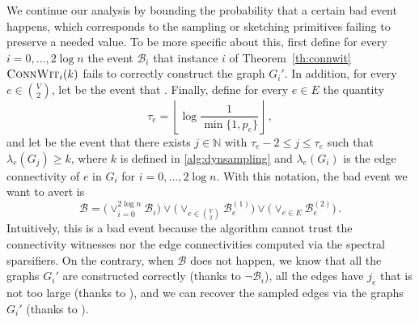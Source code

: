 \noindent
We continue our analysis by bounding the probability that a certain bad event happens, which corresponds to the sampling or sketching primitives failing to preserve a needed value. To be more specific about this, first define for every $i =0, \dots, 2\log n$ the event $\mathcal{B}_i$ that instance $i$ of Theorem~\ref{th:connwit} $\textsc{ConnWit}_i(k)$ fails to correctly construct the graph $G_i'$. In addition, for every $e \in \binom{V}{2}$, let  be the event that . Finally, define for every $e \in E$ the quantity
\begin{equation*}
	\tau_e = \left\lfloor \log \frac{1}{\min\{1, p_e\}}\right\rfloor \, ,
\end{equation*} and let  be the event that there exists $j  \in \mathbb{N}$ with $\tau_e-2 \le j \le \tau_e$ such that $\lambda_e(G_{j}) \ge k$, where $k$ is defined in \cref{alg:dynsampling} and $\lambda_e(G_i)$ is the edge connectivity of $e$ in $G_i$ for $i=0,\dots,2\log n$. With this notation, the bad event we want to avert is
\begin{equation*}
	\mathcal{B} = \Big(\vee_{i=0}^{2 \log n} \mathcal{B}_i\Big) \vee \Big(\vee_{e \in \binom{V}{2}} \mathcal{B}^{(1)}_e\Big) \vee \Big(\vee_{e \in E} \mathcal{B}^{(2)}_e\Big) \, .
\end{equation*}
Intuitively, this is a bad event because the algorithm cannot trust the connectivity witnesses nor the edge connectivities computed via the spectral sparsifiers. On the contrary, when $\mathcal{B}$ does not happen, we know that all the graphs $G_i'$ are constructed correctly (thanks to $\neg  \mathcal{B}_i$), all the edges have $j_e$ that is not too large (thanks to ), and we can recover the sampled edges via the graphs~$G_i'$ (thanks to ).


